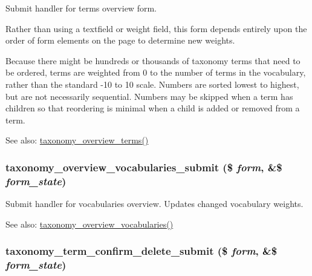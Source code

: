 Submit handler for terms overview form.

Rather than using a textfield or weight field, this form depends entirely upon the order of form elements on the page to determine new weights.

Because there might be hundreds or thousands of taxonomy terms that need to be ordered, terms are weighted from 0 to the number of terms in the vocabulary, rather than the standard -10 to 10 scale. Numbers are sorted lowest to highest, but are not necessarily sequential. Numbers may be skipped when a term has children so that reordering is minimal when a child is added or removed from a term.

\begin{Desc}
\item[See also:]\hyperlink{group__forms_g27f78faeeac394ba8359e22501c5b333}{taxonomy\_\-overview\_\-terms()} \end{Desc}
\hypertarget{taxonomy_8admin_8inc_2c0c58c11c7f85fa38bab165004f98e2}{
\subsubsection[{taxonomy\_\-overview\_\-vocabularies\_\-submit}]{\setlength{\rightskip}{0pt plus 5cm}taxonomy\_\-overview\_\-vocabularies\_\-submit (\$ {\em form}, \/  \&\$ {\em form\_\-state})}}
\label{taxonomy_8admin_8inc_2c0c58c11c7f85fa38bab165004f98e2}


Submit handler for vocabularies overview. Updates changed vocabulary weights.

\begin{Desc}
\item[See also:]\hyperlink{group__forms_g1540d991eabc53c2c1af6629455035ff}{taxonomy\_\-overview\_\-vocabularies()} \end{Desc}
\hypertarget{taxonomy_8admin_8inc_b96dee24a79d706b4b28d26ceac5e946}{
\subsubsection[{taxonomy\_\-term\_\-confirm\_\-delete\_\-submit}]{\setlength{\rightskip}{0pt plus 5cm}taxonomy\_\-term\_\-confirm\_\-delete\_\-submit (\$ {\em form}, \/  \&\$ {\em form\_\-state})}}
\label{taxonomy_8admin_8inc_b96dee24a79d706b4b28d26ceac5e946}


